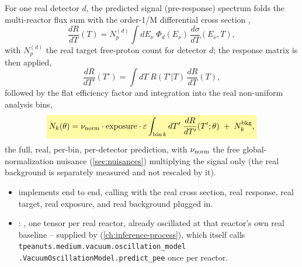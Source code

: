 
\begin{theorybox}
For one real detector $d$, the predicted signal (pre-response) spectrum
folds the multi-reactor flux sum  with the
order-1/M differential cross section ,
\begin{equation}
  \frac{dR}{dT}(T) = N_p^{(d)}\int dE_\nu\;\Phi_d(E_\nu)\,\frac{d\sigma}{dT}(E_\nu,T),
\end{equation}
with $N_p^{(d)}$ the real target free-proton count for detector $d$; the
response matrix  is then applied,
\begin{equation}
  \frac{dR}{dT'}(T') = \int dT\; R(T'|T)\,\frac{dR}{dT}(T),
\end{equation}
followed by the flat efficiency factor and integration into the real
non-uniform analysis bins,
\begin{equation}
  \keyresult{N_k(\theta) = \nu_{\rm norm}\cdot{\rm exposure}\cdot\varepsilon\int_{{\rm bin}\,k}
    dT'\;\frac{dR}{dT'}(T';\theta) \;+\; N_k^{\rm bkg},}
  \label{eq:dayabay-full-prediction}
\end{equation}
the full, real, per-bin, per-detector prediction, with $\nu_{\rm norm}$
the free global-normalization nuisance (\cref{sec:nuisances}) multiplying
the signal only (the real background is separately measured and not
rescaled by it).
\end{theorybox}

\begin{implbox}
\begin{itemize}
  \item {}
    implements  end to end, calling
     with the real
    cross section, real response, real target, real exposure, and real
    background plugged in.
  \item {}: , one
    tensor per real reactor, already oscillated at that reactor's own
    real baseline -- supplied by
    (\cref{ch:inference-process}), which itself calls
    \texttt{tpeanuts.medium.vacuum.oscillation\_model
    .VacuumOscillationModel.predict\_pee} once per reactor.
\end{itemize}
\end{implbox}

